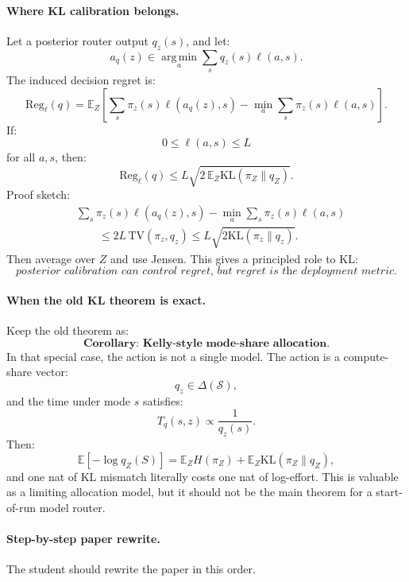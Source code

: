\documentclass{article}
\providecommand{\KL}{\mathrm{KL}}
\providecommand{\argmin}{\operatorname*{arg\,min}}
\begin{document}
\paragraph{Where KL calibration belongs.}
Let a posterior router output \(q_z(s)\), and let:
\[
    a_q(z)
    \in
    \argmin_a \sum_s q_z(s)\ell(a,s).
\]
The induced decision regret is:
\[
    \mathrm{Reg}_{\ell}(q)
    =
    \mathbb E_Z
    \left[
    \sum_s \pi_z(s)\ell(a_q(z),s)
    -
    \min_a \sum_s \pi_z(s)\ell(a,s)
    \right].
\]
If:
\[
    0\le \ell(a,s)\le L
\]
for all \(a,s\), then:
\[
    \mathrm{Reg}_{\ell}(q)
    \le
    L\sqrt{2\,\mathbb E_Z\KL(\pi_Z\|q_Z)}.
\]
Proof sketch:
\[
\begin{aligned}
    &\sum_s \pi_z(s)\ell(a_q(z),s)
    -
    \min_a \sum_s\pi_z(s)\ell(a,s)\\
    &\qquad\le
    2L\,\mathrm{TV}(\pi_z,q_z)
    \le
    L\sqrt{2\KL(\pi_z\|q_z)}.
\end{aligned}
\]
Then average over \(Z\) and use Jensen.
This gives a principled role to KL:
\[
    \textit{posterior calibration can control regret, but regret is the deployment metric.}
\]

\paragraph{When the old KL theorem is exact.}
Keep the old theorem as:
\[
    \textbf{Corollary: Kelly-style mode-share allocation.}
\]
In that special case, the action is not a single model.
The action is a compute-share vector:
\[
    q_z\in\Delta(\mathcal S),
\]
and the time under mode \(s\) satisfies:
\[
    T_q(s,z)\propto \frac{1}{q_z(s)}.
\]
Then:
\[
    \mathbb E[-\log q_Z(S)]
    =
    \mathbb E_ZH(\pi_Z)+\mathbb E_Z\KL(\pi_Z\|q_Z),
\]
and one nat of KL mismatch literally costs one nat of log-effort.
This is valuable as a limiting allocation model, but it should not be the main theorem for
a start-of-run model router.

\paragraph{Step-by-step paper rewrite.}
The student should rewrite the paper in this order.
\end{document}
